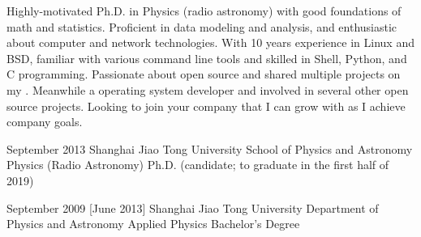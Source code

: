 \documentclass{resume}
\begin{document}
\makeheader

Highly-motivated Ph.D. in Physics (radio astronomy) with good foundations
of math and statistics.
Proficient in data modeling and analysis,
and enthusiastic about computer and network technologies.
With 10 years experience in Linux and BSD,
familiar with various command line tools and
skilled in Shell, Python, and C programming.
Passionate about open source and shared multiple projects on my
.
Meanwhile a 
operating system developer and involved in several other
open source projects.
Looking to join your company that I can grow with as I achieve
company goals.

\begin{competences}[10em]
\end{competences}

\begin{educations}
  \education%
    {September 2013}%
    {Shanghai Jiao Tong University}%
    {School of Physics and Astronomy}%
    {Physics (Radio Astronomy)}%
    {Ph.D. (candidate; to graduate in the first half of 2019)}

  \separator{0.5em}
  \education%
    {September 2009}%
    [June 2013]%
    {Shanghai Jiao Tong University}%
    {Department of Physics and Astronomy}%
    {Applied Physics}%
    {Bachelor's Degree}
\end{educations}
\end{document}
